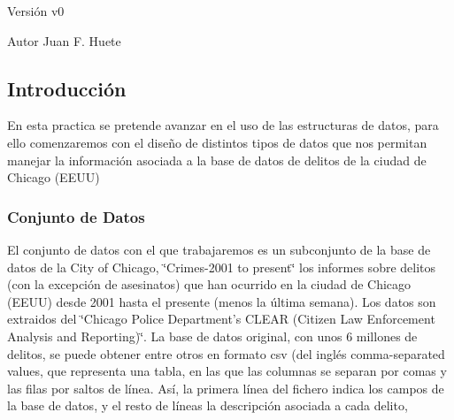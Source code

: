 \begin{DoxyVersion}{Versión}
v0 
\end{DoxyVersion}
\begin{DoxyAuthor}{Autor}
Juan F. Huete
\end{DoxyAuthor}
\hypertarget{index_introsec}{}\subsection{Introducción}\label{index_introsec}
En esta practica se pretende avanzar en el uso de las estructuras de datos, para ello comenzaremos con el diseño de distintos tipos de datos que nos permitan manejar la información asociada a la base de datos de delitos de la ciudad de Chicago (E\-E\-U\-U)\hypertarget{index_baseDatos}{}\subsubsection{Conjunto de Datos}\label{index_baseDatos}
El conjunto de datos con el que trabajaremos es un subconjunto de la base de datos de la City of Chicago, \char`\"{}\-Crimes-\/2001 to present\char`\"{} los informes sobre delitos (con la excepción de asesinatos) que han ocurrido en la ciudad de Chicago (E\-E\-U\-U) desde 2001 hasta el presente (menos la última semana). Los datos son extraidos del \char`\"{}\-Chicago Police Department's C\-L\-E\-A\-R (\-Citizen Law Enforcement Analysis and Reporting)\char`\"{}. La base de datos original, con unos 6 millones de delitos, se puede obtener entre otros en formato csv (del inglés comma-\/separated values, que representa una tabla, en las que las columnas se separan por comas y las filas por saltos de línea. Así, la primera línea del fichero indica los campos de la base de datos, y el resto de líneas la descripción asociada a cada delito,


